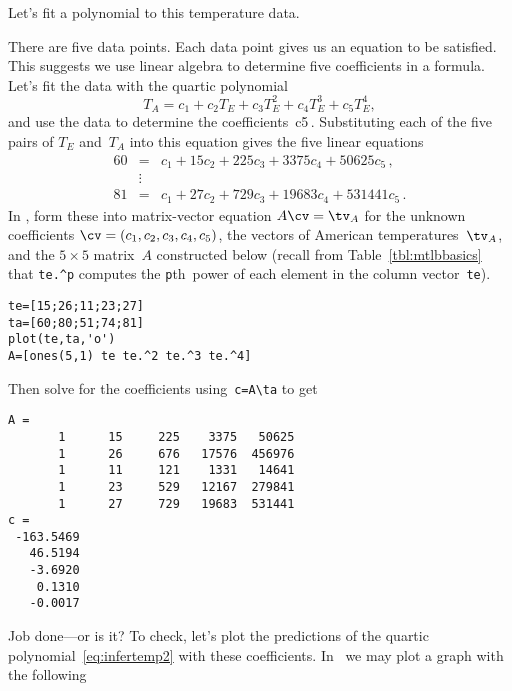 \begin{example}
Let's fit a polynomial to this temperature data.
\begin{solution}
There are five data points.
Each data point gives us an equation to be satisfied.
This suggests we use linear algebra to determine five coefficients in a formula.
Let's fit the data with the quartic polynomial
\begin{equation}
T_A=c_1+c_2T_E+c_3T_E^2+c_4T_E^3+c_5T_E^4,
\label{eq:infertemp2}
\end{equation}
and use the data to determine the coefficients~\hlist c5\,.
Substituting each of the five pairs of \(T_E\) and~\(T_A\) into this equation gives the five linear equations
\begin{eqnarray*}
60&=&c_1+15c_2+225c_3+3375c_4+50625c_5\,, \\
&\vdots&\\
81&=&c_1+27c_2+729c_3+19683c_4+531441c_5\,.
\end{eqnarray*}
In \script, form these into matrix-vector equation \(A\cv=\tv_A\) for the unknown coefficients \(\cv=(c_1,c_2,c_3,c_4,c_5)\), the vectors of American temperatures~\(\tv_A\), and the \(5\times5\) matrix~\(A\) constructed below (recall from Table~\ref{tbl:mtlbbasics} that \verb|te.^p| computes the \verb|p|th~power of each element in the column vector~\verb|te|).
\setbox\ajrqrbox\hbox{}%
\marginpar{\usebox{\ajrqrbox\\[2ex]}}%
\begin{verbatim}
te=[15;26;11;23;27]
ta=[60;80;51;74;81]
plot(te,ta,'o')
A=[ones(5,1) te te.^2 te.^3 te.^4]
\end{verbatim}
Then solve for the coefficients using~\verb|c=A\ta| to get
\begin{verbatim}
A =
       1      15     225    3375   50625
       1      26     676   17576  456976
       1      11     121    1331   14641
       1      23     529   12167  279841
       1      27     729   19683  531441
c =
 -163.5469
   46.5194
   -3.6920
    0.1310
   -0.0017
\end{verbatim}
Job done---or is it?
To check, let's plot the predictions of the quartic polynomial~\eqref{eq:infertemp2} with these coefficients.
In \script\ we may plot a graph with the following
\setbox\ajrqrbox\hbox{}%
\marginpar{\usebox{\ajrqrbox\\[2ex]}}%

\end{solution}
\end{example}
